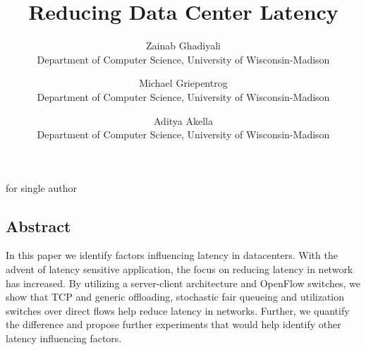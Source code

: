 \documentclass[letterpaper,twocolumn,10pt]{article}
\begin{document}
\date{} 
\title{
\Large 
\bf Reducing Data Center Latency
}

for single author \author{ 
{\rm Zainab Ghadiyali}\\ Department of Computer
Science, University of Wisconsin-Madison 
\and {\rm Michael Griepentrog}\\
Department of Computer Science, University of Wisconsin-Madison 
\and{\rm Aditya Akella}\\
Department of Computer Science, University of Wisconsin-Madison
} 


\maketitle

\thispagestyle{empty}
\subsection{Abstract}
In this paper we identify factors influencing latency in datacenters. With the
advent of latency sensitive application, the focus on reducing latency in
network has increased. By utilizing a server-client architecture and OpenFlow
switches, we show that TCP and generic offloading, stochastic fair
queueing and utilization switches over direct flows help reduce latency in
networks. Further, we quantify the difference and propose further experiments
that would help identify other latency influencing factors. 
\end{document}
